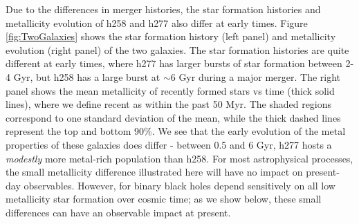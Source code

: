 \documentclass[nofootinbib,twocolumn,prd]{emulateapj}
\begin{document}
  Due to the differences in merger histories, the star formation histories and metallicity
  evolution of h258 and h277 also differ at early times.  Figure
  \ref{fig:TwoGalaxies} shows the star formation history (left panel) and metallicity evolution (right panel) of the two galaxies.  The star formation histories are quite different at early times, where h277 has larger bursts of star formation between 2-4 Gyr, but h258 has a large burst at $\sim 6$ Gyr during a major merger.   The right panel shows the mean metallicity of
  recently formed stars vs time (thick solid lines), where we define
  recent as within the past 50 Myr.  The shaded regions correspond to
  one standard deviation of the mean, while the thick dashed lines
  represent the top and bottom 90\%.  We see that the early evolution
  of the metal properties of these galaxies does differ - between 0.5
  and 6 Gyr, h277 hosts a \emph{modestly}  more metal-rich population than
  h258.   For most astrophysical processes, the small metallicity difference illustrated here will have no impact on
  present-day observables.  However, for binary black holes depend sensitively on all low metallicity star formation
  over cosmic time; as we show below, these small differences can have an observable impact at present.   
\end{document}
